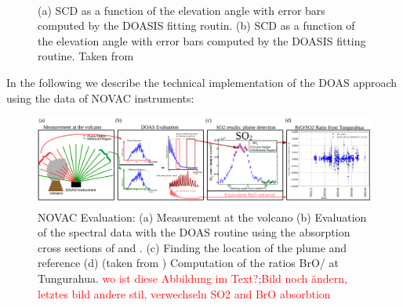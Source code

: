 \\
\begin{figure}
	\caption{(a)  SCD as a function of the elevation angle with error bars computed by the DOASIS fitting routin. (b)  SCD as a function of the elevation angle with error bars computed by the DOASIS fitting routine.  Taken from \cite{WarnachSimon}}
	\label{fig:plumeref}
\end{figure}
%
In the following we describe the technical implementation of the DOAS approach using the data of NOVAC instruments:\\
\begin{figure}
	\centering
	\includegraphics[width=1\linewidth]{Bilder/NOVAC_Eval}
	\caption{NOVAC Evaluation: (a) Measurement at the volcano (b) Evaluation of the spectral data with the DOAS routine using the absorption cross sections of   and . (c) Finding the location of the plume and reference (d) (taken from \cite{WarnachSimon}) Computation of the ratios BrO/ at Tungurahua. \textcolor{red}{wo ist diese Abbildung im Text?};\textcolor{red}{Bild noch ändern, letztes bild andere stil, verwechseln SO2 and BrO absorbtion }}
	\label{fig:NOVAC_Eval}
\end{figure}
